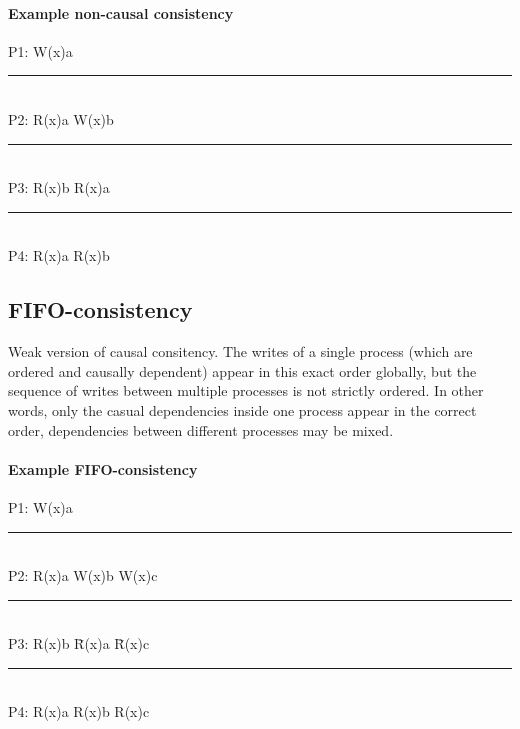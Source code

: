 \paragraph{Example non-causal consistency}
\begin{tabbing}
P1: W(x)a \= \\
\rule{0.4\textwidth}{0.4pt} \\
P2: \> R(x)a \hspace{5pt} W(x)b \= \\
\rule{0.4\textwidth}{0.4pt} \\
P3: \> \> R(x)b \hspace{5pt} R(x)a \\
\rule{0.4\textwidth}{0.4pt} \\
P4: \> \> R(x)a \hspace{5pt} R(x)b \\
\end{tabbing}

\subsection{FIFO-consistency}
Weak version of causal consitency.
The writes of a single process (which are ordered and causally dependent) appear in this exact order globally, but the sequence of writes between multiple processes is not strictly ordered. In other words, only the casual dependencies inside one process appear in the correct order, dependencies between different processes may be mixed.
\paragraph{Example FIFO-consistency}
\begin{tabbing}
P1: W(x)a \= \\
\rule{0.6\textwidth}{0.4pt} \\
P2: \> R(x)a \hspace{5pt} W(x)b \hspace{5pt} W(x)c \= \\
\rule{0.6\textwidth}{0.4pt} \\
P3: \> \> R(x)b \hspace{5pt} \= R(x)a \hspace{5pt} \= R(x)c \\
\rule{0.6\textwidth}{0.4pt} \\
P4: \> \> R(x)a \> R(x)b \> R(x)c \\
\end{tabbing}

